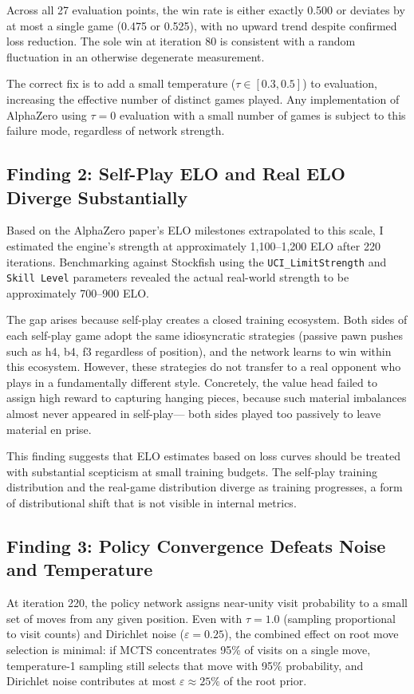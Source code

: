 \documentclass[conference]{IEEEtran}
\begin{document}
Across all 27 evaluation points, the win rate is either exactly 0.500 or
deviates by at most a single game (0.475 or 0.525), with no upward trend
despite confirmed loss reduction. The sole win at iteration 80 is consistent
with a random fluctuation in an otherwise degenerate measurement.

The correct fix is to add a small temperature ($\tau \in [0.3, 0.5]$) to
evaluation, increasing the effective number of distinct games played. Any
implementation of AlphaZero using $\tau=0$ evaluation with a small number of
games is subject to this failure mode, regardless of network strength.

\subsection{Finding 2: Self-Play ELO and Real ELO Diverge Substantially}

Based on the AlphaZero paper's ELO milestones extrapolated to this scale, I
estimated the engine's strength at approximately 1,100--1,200 ELO after 220
iterations. Benchmarking against Stockfish using the \texttt{UCI\_LimitStrength}
and \texttt{Skill Level} parameters revealed the actual real-world strength to
be approximately 700--900 ELO.

The gap arises because self-play creates a closed training ecosystem.
Both sides of each self-play game adopt the same idiosyncratic strategies
(passive pawn pushes such as h4, b4, f3 regardless of position), and the
network learns to win within this ecosystem. However, these strategies do not
transfer to a real opponent who plays in a fundamentally different style.
Concretely, the value head failed to assign high reward to capturing hanging
pieces, because such material imbalances almost never appeared in self-play---
both sides played too passively to leave material en prise.

This finding suggests that ELO estimates based on loss curves should be treated
with substantial scepticism at small training budgets. The self-play training
distribution and the real-game distribution diverge as training progresses,
a form of distributional shift that is not visible in internal metrics.

\subsection{Finding 3: Policy Convergence Defeats Noise and Temperature}

At iteration 220, the policy network assigns near-unity visit probability to a
small set of moves from any given position. Even with $\tau=1.0$ (sampling
proportional to visit counts) and Dirichlet noise ($\varepsilon=0.25$), the
combined effect on root move selection is minimal: if MCTS concentrates 95\%
of visits on a single move, temperature-1 sampling still selects that move
with 95\% probability, and Dirichlet noise contributes at most
$\varepsilon \approx 25\%$ of the root prior.
\end{document}
